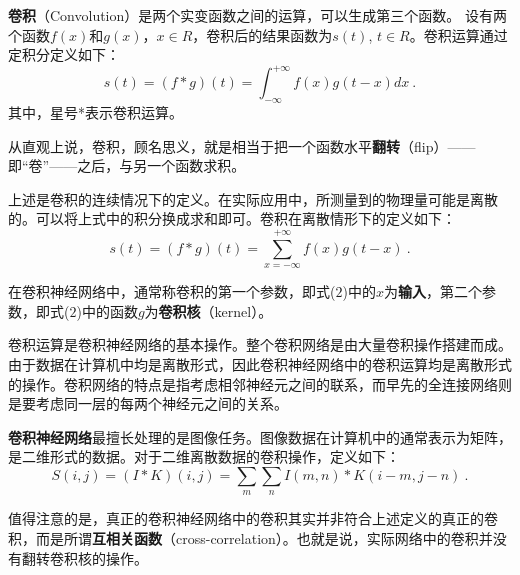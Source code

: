 
\begin{issues}
\issueMissDepend
\end{issues}

\textbf{卷积}（Convolution）是两个实变函数之间的运算，可以生成第三个函数。
设有两个函数$f(x)$和$g(x)$，$x \in R$，卷积后的结果函数为$s(t)$, $t \in R$。卷积运算通过定积分定义如下：
\begin{equation}
s(t) = (f*g)(t) = \int_{ - \infty }^{ + \infty } {f(x)g(t - x)dx}~.
\end{equation}
其中，星号*表示卷积运算。

从直观上说，卷积，顾名思义，就是相当于把一个函数水平\textbf{翻转}（flip）——即“卷”——之后，与另一个函数求积。

上述是卷积的连续情况下的定义。在实际应用中，所测量到的物理量可能是离散的。可以将上式中的积分换成求和即可。卷积在离散情形下的定义如下：
\begin{equation}
s(t) = (f*g)(t) = \sum_{ x = - \infty }^{ + \infty } {f(x)g(t - x)}~.
\end{equation}

在卷积神经网络中，通常称卷积的第一个参数，即式($2$)中的$x$为\textbf{输入}，第二个参数，即式($2$)中的函数$g$为\textbf{卷积核}（kernel）。

卷积运算是卷积神经网络的基本操作。整个卷积网络是由大量卷积操作搭建而成。由于数据在计算机中均是离散形式，因此卷积神经网络中的卷积运算均是离散形式的操作。卷积网络的特点是指考虑相邻神经元之间的联系，而早先的全连接网络则是要考虑同一层的每两个神经元之间的关系。

\textbf{卷积神经网络}最擅长处理的是图像任务。图像数据在计算机中的通常表示为矩阵，是二维形式的数据。对于二维离散数据的卷积操作，定义如下：
\begin{equation}
S(i,j) = (I*K)(i,j) = \sum_{m}\sum_{n}I(m,n)*K(i-m,j-n)~.
\end{equation}

值得注意的是，真正的卷积神经网络中的卷积其实并非符合上述定义的真正的卷积，而是所谓\textbf{互相关函数}（cross-correlation）。也就是说，实际网络中的卷积并没有翻转卷积核的操作\cite{GDL}。